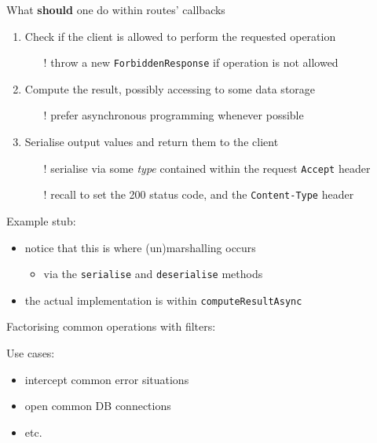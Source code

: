 \documentclass[presentation]{beamer}\mode<presentation>{\usetheme{AMSCesenaPurpleAndGold}}
\begin{document}
\begin{frame}[allowframebreaks]
\begin{block}{What \textbf{should} one do within routes' callbacks}
\begin{enumerate}
            \item Check if the client \alert{is allowed} to perform the requested operation
            \begin{itemize}
                \item[!] throw a new \texttt{ForbiddenResponse} if operation is not allowed
            \end{itemize}

            \item Compute the result, possibly accessing to some data storage
            \begin{itemize}
                \item[!] prefer asynchronous programming whenever possible
            \end{itemize}

            \item \alert{Serialise} output values and return them to the client
            \begin{itemize}
                \item[!] serialise via some \emph{type} contained within the request \texttt{Accept} header  
                \item[!] recall to set the 200 status code, and the \texttt{Content-Type} header
            \end{itemize}
        \end{enumerate}
    \end{block}

    \framebreak

    Example stub:
    
    \begin{itemize}
        \item notice that this is where \alert{(un)marshalling} occurs
        \begin{itemize}
            \item via the \texttt{serialise} and \texttt{deserialise} methods
        \end{itemize}

        \item the actual implementation is within \texttt{computeResultAsync}
    \end{itemize}

    \framebreak

    Factorising common operations with \alert{filters}:
    
    Use cases:
    \begin{itemize}
        \item intercept common error situations
        \item open common DB connections
        \item etc.
    \end{itemize}

\end{frame}
\end{document}
